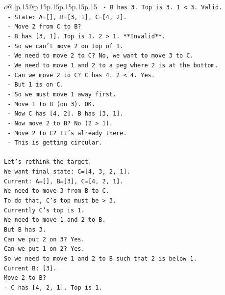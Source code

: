\documentclass{article}
\begin{document}
{\begin{supertabular}{c@{$\;$}|p{.15\linewidth}@{}p{.15\linewidth}p{.15\linewidth}p{.15\linewidth}p{.15\linewidth}p{.15\linewidth}}
{{{\texttt{     {-} B has 3. Top is 3. 1 < 3. Valid.} \\
\texttt{     {-} State: A={[}{]}, B={[}3, 1{]}, C={[}4, 2{]}.} \\
\texttt{   {-} Move 2 from C to B?} \\
\texttt{     {-} B has {[}3, 1{]}. Top is 1. 2 > 1. **Invalid**.} \\
\texttt{   {-} So we can't move 2 on top of 1.} \\
\texttt{   {-} We need to move 2 to C? No, we want to move 3 to C.} \\
\texttt{   {-} We need to move 1 and 2 to a peg where 2 is at the bottom.} \\
\texttt{   {-} Can we move 2 to C? C has 4. 2 < 4. Yes.} \\
\texttt{   {-} But 1 is on C.} \\
\texttt{   {-} So we must move 1 away first.} \\
\texttt{   {-} Move 1 to B (on 3). OK.} \\
\texttt{   {-} Now C has {[}4, 2{]}. B has {[}3, 1{]}.} \\
\texttt{   {-} Now move 2 to B? No (2 > 1).} \\
\texttt{   {-} Move 2 to C? It's already there.} \\
\texttt{   {-} This is getting circular.} \\
\\ 
\texttt{Let's rethink the target.} \\
\texttt{We want final state: C={[}4, 3, 2, 1{]}.} \\
\texttt{Current: A={[}{]}, B={[}3{]}, C={[}4, 2, 1{]}.} \\
\texttt{We need to move 3 from B to C.} \\
\texttt{To do that, C's top must be > 3.} \\
\texttt{Currently C's top is 1.} \\
\texttt{We need to move 1 and 2 to B.} \\
\texttt{But B has 3.} \\
\texttt{Can we put 2 on 3? Yes.} \\
\texttt{Can we put 1 on 2? Yes.} \\
\texttt{So we need to move 1 and 2 to B such that 2 is below 1.} \\
\texttt{Current B: {[}3{]}.} \\
\texttt{Move 2 to B?} \\
\texttt{{-} C has {[}4, 2, 1{]}. Top is 1.} \\
}}}
\end{supertabular}}
\end{document}
